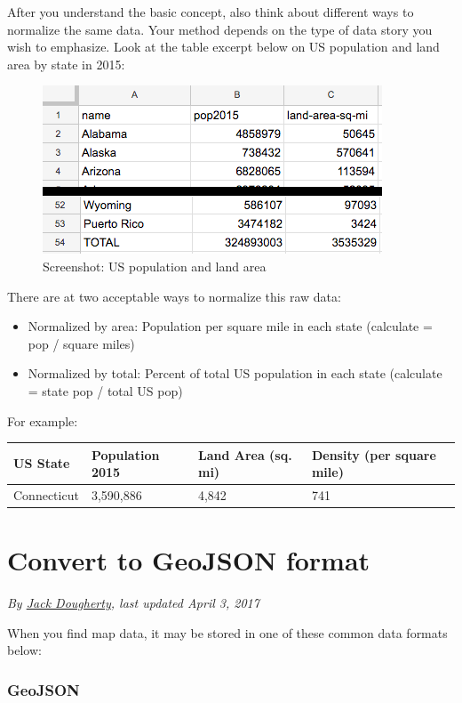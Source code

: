 \documentclass[
  english,
]{book}
\providecommand{\tightlist}{%
  \setlength{\itemsep}{0pt}\setlength{\parskip}{0pt}}
\begin{document}
After you understand the basic concept, also think about different ways to normalize the same data. Your method depends on the type of data story you wish to emphasize. Look at the table excerpt below on US population and land area by state in 2015:

\begin{figure}
\centering
\includegraphics{images/09-transform/us-population-area-2015.png}
\caption{Screenshot: US population and land area}
\end{figure}

There are at two acceptable ways to normalize this raw data:

\begin{itemize}
\tightlist
\item
  Normalized by area: Population per square mile in each state (calculate = pop / square miles)
\item
  Normalized by total: Percent of total US population in each state (calculate = state pop / total US pop)
\end{itemize}

For example:

\begin{longtable}[]{@{}llll@{}}
\toprule
US State & Population 2015 & Land Area (sq. mi) & Density (per square mile)\tabularnewline
\midrule
\endhead
Connecticut & 3,590,886 & 4,842 & 741\tabularnewline
\bottomrule
\end{longtable}

\hypertarget{convert-geojson}{%
\section{Convert to GeoJSON format}\label{convert-geojson}}

\emph{By \href{authors}{Jack Dougherty}, last updated April 3, 2017}

When you find map data, it may be stored in one of these common data formats below:

\hypertarget{geojson}{%
\subsubsection*{GeoJSON}\label{geojson}}
\end{document}
